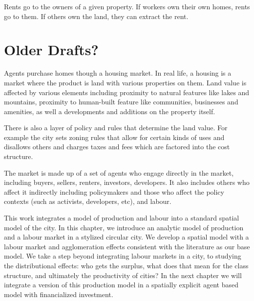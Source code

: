 Rents go to the owners of a given property. If workers own their own homes, rents go to them. If others own the land, they can extract the rent. %



\section{Older Drafts?}
Agents purchase homes though a housing market.
In real life, a housing is a market where the product is land with various properties on them. Land value is affected by various elements including proximity to natural features like lakes and mountains, proximity to human-built feature like communities, businesses and amenities, as well a developments and additions on the property itself. 

There is also a layer of policy and rules that determine the land value. For example the city sets zoning rules that allow for certain kinds of uses and disallows others and charges taxes and fees which are factored into the cost structure.

The market is made up of a set of agents who engage directly in the market, including buyers, sellers, renters, investors, developers. 
It also includes others who affect it indirectly including policymakers and those who affect the policy contexts (such as activists, developers, etc), and labour.



This work integrates a model of production and labour into a standard spatial model of the city. 
In this chapter, we introduce an analytic model of production and a labour market in a stylized circular city. 
We develop a spatial model with a labour market and agglomeration effects consistent with the literature as our base model. 
We take a step beyond integrating labour markets in a city, to studying the distributional effects: who gets the surplus, what does that mean for the class structure, and ultimately the productivity of cities? 
In the next chapter we will integrate a version of this production model in a spatially explicit agent based model with financialized investment. 

